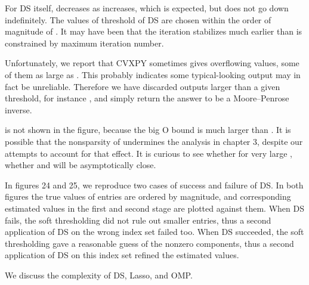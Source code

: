 For DS itself, \m {\T {\chi}} decreases as \m {\s} increases, which is expected, but \m {\T {\chi}} does not go down indefinitely.
The values of threshold of DS  are chosen within the order of magnitude of \m {\s}.
It may have been that the iteration stabilizes much earlier than is constrained by maximum iteration number.

Unfortunately, we report that CVXPY sometimes gives overflowing values, some of them as large as .
This probably indicates some typical-looking output may in fact be unreliable.
Therefore we have discarded outputs larger than a given threshold, for instance , and simply return the answer to be a Moore–Penrose inverse.

\m {\T {\chi}} is not shown in the figure, because the big O bound is much larger than \m {\chi}.
It is possible that the nonsparsity of  undermines the analysis in chapter 3, despite our attempts to account for that effect.
It is curious to see whether for very large , whether \m {\T {\chi}} and \m {\T {\chi}} will be asymptotically close.

In figures 24 and 25, we reproduce two cases of success and failure of DS.
In both figures the true values of  entries are ordered by magnitude, and corresponding estimated values in the first and second stage are plotted against them.
When DS fails, the soft thresholding did not rule out smaller entries, thus a second application of DS on the wrong index set failed too.
When DS succeeded, the soft thresholding gave a reasonable guess of the nonzero components, thus a second application of DS on this index set refined the estimated values.

\blank [big]
\blank [big]

\blank [big]
\blank [big]

\stopsection

\startsection [title={Complexity}]

We discuss the complexity of DS, Lasso, and OMP.

\startsubsection [title={Dantzig selector}]

\stopsubsection

\stopsubsection


